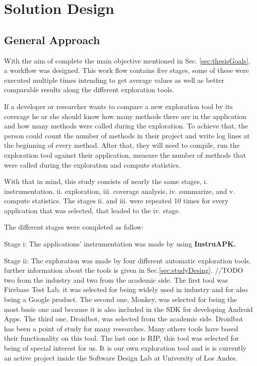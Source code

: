 
\chapter{Solution Design} %

\label{Chapter4} %

\section{General Approach} \label{sec:generalApproach}

With the aim of complete the main objective mentioned in Sec. \ref{sec:thesisGoals}, a workflow was designed. This work flow contains five stages, some of these were executed multiple times intending to get average values as well as better comparable results along the different exploration tools.

If a developer or researcher wants to compare a new exploration tool by its coverage he or she should know how many methods there are in the application and how many methods were called during the exploration. To achieve that, the person could count the number of methods in their project and write log lines at the beginning of every method. After that, they will need to compile, run the exploration tool against their application, measure the number of methods that were called during the exploration and compute statistics.

With that in mind, this study consists of nearly the same stages, i. instrumentation, ii. exploration, iii. coverage analysis, iv. summarize, and v. compute statistics. The stages ii. and iii. were repeated 10 times for every application that was selected, that leaded to the iv. stage.

The different stages were completed as follow:

Stage i: The applications' instrumentation was made by using \textbf{InstruAPK.}

Stage ii: The exploration was made by four different automatic exploration tools. further information about the tools is given in Sec.\ref{sec:studyDesing}.
//TODO
two from the industry and two from the academic side. The first tool was Firebase Test Lab. it was selected for being widely used in industry and for also being a Google product. The second one, Monkey, was selected for being the most basic one and because it is also included in the SDK for developing Android Apps. The third one, Droidbot, was selected from the academic side. Droidbot has been a point of study for many researches. Many others tools have based their functionality on this tool. The last one is RIP, this tool was selected for being of special interest for us. It is our own exploration tool and is is currently an active project inside the Software Design Lab at University of Los Andes. 

